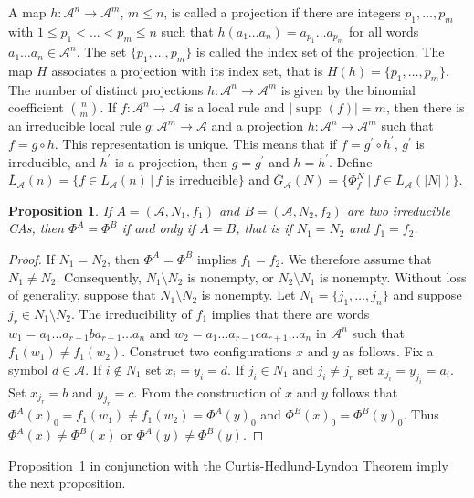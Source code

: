 \documentclass[a4paper]{article}
\newcommand{\supp}{\mathop{\mathrm{supp}}}
\newtheorem{prop}{Proposition}
\begin{document}
A map $h: \mathcal{A}^n \to \mathcal{A}^m$, $m \le n$, is called a projection if
there are integers $p_1, \ldots, p_{m}$ with $1 \leq p_1 < \ldots < p_{m} \leq n$ such that
$h(a_1\ldots a_{n}) = a_{p_1}\ldots a_{p_{m}}$ for all words $a_1\ldots a_{n} \in \mathcal{A}^n$.
The set $\{p_1, \ldots, p_{m}\}$ is called the index set of the projection.
The map $H$ associates a projection with its index set, that is $H(h) = \{p_1, \ldots, p_{m}\}$.
The number of distinct projections $h : \mathcal{A}^n \to \mathcal{A}^m$ is given by
the binomial coefficient $\binom{n}{m}$.
If $f: \mathcal{A}^n \to \mathcal{A}$ is a local rule and $|\supp(f)| = m$,
then there is an irreducible local rule $g: \mathcal{A}^m \to \mathcal{A}$ and a projection
$h : \mathcal{A}^n \to \mathcal{A}^m$ such
that $f = g \circ h$.
This representation is unique.
This means that if $f = g^\prime \circ h^\prime$, $g^\prime$ is irreducible, and $h^\prime$ is a projection,
then $g = g^\prime$ and $h = h^\prime$.
Define $\overline{L}_\mathcal{A}(n) = \{f \in L_\mathcal{A}(n) \, | \, \mbox{$f$ is irreducible}  \}$ and
$\overline{G}_\mathcal{A}(N) = \{ \Phi_f^N \ | \ f \in \overline{L}_\mathcal{A}(|N|) \}$.
\begin{prop}
\label{prop:uniqueness}
If $A=(\mathcal{A}, N_1, f_1)$ and $B=(\mathcal{A}, N_2, f_2)$ are two irreducible CAs,
then $\Phi^A = \Phi^B$ if and only if $A=B$, that is if $N_1 = N_2$ and $f_1 = f_2$.
\end{prop}
\begin{proof}
If $N_1 = N_2$, then $\Phi^A = \Phi^B$ implies $f_1 = f_2$.
We therefore assume that $N_1 \neq N_2$.
Consequently, $N_1 \setminus N_2$ is nonempty, or $N_2 \setminus N_1$ is nonempty.
Without loss of generality, suppose that $N_1 \setminus N_2$ is nonempty.
Let $N_1 = \{j_1, \ldots, j_{n} \}$ and suppose $j_r \in N_1 \setminus N_2$.
The irreducibility of $f_1$ implies that there are words
$w_1 = a_1 \ldots a_{r-1}ba_{r+1} \ldots a_{n}$ and
$w_2 =a_1 \ldots a_{r-1}ca_{r+1} \ldots a_{n}$ in $\mathcal{A}^n$
such that $f_1(w_1) \neq f_1(w_2)$.
Construct two configurations $x$ and $y$ as follows.
Fix a symbol $d \in \mathcal{A}$.
If $i \not\in N_1$ set $x_i = y_i = d$.
If $j_i \in N_1$ and $j_i \neq j_r$ set $x_{j_i} = y_{j_i} = a_i$.
Set $x_{j_r} = b$ and $y_{j_r} = c$.
From the construction of $x$ and $y$ follows that $\Phi^A(x)_0 = f_1(w_1) \neq f_1(w_2) = \Phi^A(y)_0$ and
$\Phi^B(x)_0 = \Phi^B(y)_0$.
Thus $\Phi^A(x) \neq \Phi^B(x)$ or $\Phi^A(y) \neq \Phi^B(y)$.
\end{proof}
Proposition~\ref{prop:uniqueness} in conjunction with the Curtis-Hedlund-Lyndon Theorem imply the next proposition.
\end{document}
